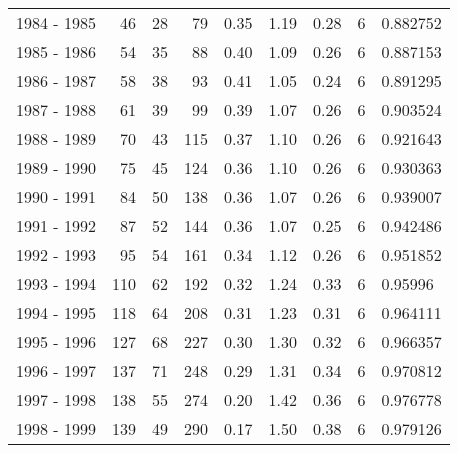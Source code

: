 \begin{tabular}{lrrrrrrrl}
1984 - 1985 &                      46 &          28 &       79 &        0.35 &        1.19 &        0.28 &           6 &   0.882752 \\
1985 - 1986 &                      54 &          35 &       88 &        0.40 &        1.09 &        0.26 &           6 &   0.887153 \\
1986 - 1987 &                      58 &          38 &       93 &        0.41 &        1.05 &        0.24 &           6 &   0.891295 \\
1987 - 1988 &                      61 &          39 &       99 &        0.39 &        1.07 &        0.26 &           6 &   0.903524 \\
1988 - 1989 &                      70 &          43 &      115 &        0.37 &        1.10 &        0.26 &           6 &   0.921643 \\
1989 - 1990 &                      75 &          45 &      124 &        0.36 &        1.10 &        0.26 &           6 &   0.930363 \\
1990 - 1991 &                      84 &          50 &      138 &        0.36 &        1.07 &        0.26 &           6 &   0.939007 \\
1991 - 1992 &                      87 &          52 &      144 &        0.36 &        1.07 &        0.25 &           6 &   0.942486 \\
1992 - 1993 &                      95 &          54 &      161 &        0.34 &        1.12 &        0.26 &           6 &   0.951852 \\
1993 - 1994 &                     110 &          62 &      192 &        0.32 &        1.24 &        0.33 &           6 &    0.95996 \\
1994 - 1995 &                     118 &          64 &      208 &        0.31 &        1.23 &        0.31 &           6 &   0.964111 \\
1995 - 1996 &                     127 &          68 &      227 &        0.30 &        1.30 &        0.32 &           6 &   0.966357 \\
1996 - 1997 &                     137 &          71 &      248 &        0.29 &        1.31 &        0.34 &           6 &   0.970812 \\
1997 - 1998 &                     138 &          55 &      274 &        0.20 &        1.42 &        0.36 &           6 &   0.976778 \\
1998 - 1999 &                     139 &          49 &      290 &        0.17 &        1.50 &        0.38 &           6 &   0.979126 \\

\end{tabular}
